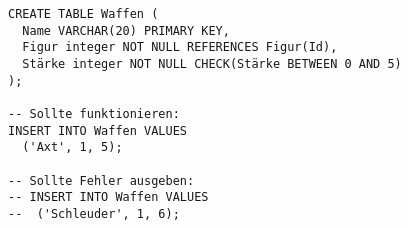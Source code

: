 \documentclass{bschlangaul-aufgabe}
\begin{document}
\begin{enumerate}
\begin{bAntwort}
\begin{verbatim}
CREATE TABLE Waffen (
  Name VARCHAR(20) PRIMARY KEY,
  Figur integer NOT NULL REFERENCES Figur(Id),
  Stärke integer NOT NULL CHECK(Stärke BETWEEN 0 AND 5)
);

-- Sollte funktionieren:
INSERT INTO Waffen VALUES
  ('Axt', 1, 5);

-- Sollte Fehler ausgeben:
-- INSERT INTO Waffen VALUES
--  ('Schleuder', 1, 6);
\end{verbatim}
\end{bAntwort}
\end{enumerate}
\end{document}
